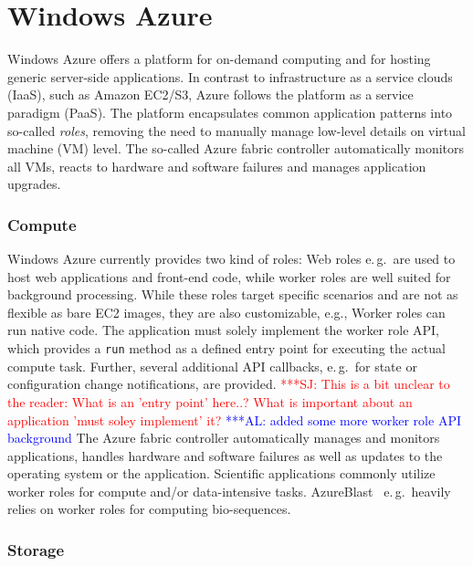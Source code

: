 \documentclass[conference,final]{IEEEtran}
\newcommand{\up}{\vspace*{-1em}}
\newcommand{\alnote}[1]{ {\textcolor{blue} { ***AL: #1 }}}
\newcommand{\jhanote}[1]{ {\textcolor{red} { ***SJ: #1 }}}
\newcommand{\alnote}[1]{}
\newcommand{\jhanote}[1]{}
\begin{document}
\section{Windows Azure}
\label{sec:azure}
\up
Windows Azure offers a platform for on-demand computing and for
hosting generic server-side applications.  In contrast to
infrastructure as a service clouds (IaaS), such as Amazon EC2/S3,
Azure follows the platform as a service paradigm (PaaS).  The platform
encapsulates common application patterns into so-called {\it roles},
removing the need to manually manage low-level details on virtual
machine (VM) level.  The so-called Azure fabric controller
automatically monitors all VMs, reacts to hardware and software
failures and manages application upgrades.

\subsubsection{Compute}

Windows Azure currently provides two kind of 
roles: Web roles e.\,g.\ are used to host web applications and
front-end code, while worker roles are well suited for background
processing. While these roles target specific scenarios and are not as
flexible as bare EC2 images, they are also customizable, %
e.g., Worker roles can run native code. The application must solely
implement the worker role API, which provides a \texttt{run} method as 
a defined entry point for executing the actual compute task. Further,
several additional API callbacks, e.\,g.\ for state or configuration
change notifications, are provided.%
\jhanote{This is a bit unclear to the
  reader: What is an 'entry point' here..? What is important about an
  application 'must soley implement' it?} \alnote{added some
  more worker role API background}
The Azure fabric controller automatically manages and monitors
applications, handles hardware and software failures as well as
updates to the operating system or the application.  Scientific
applications commonly utilize worker roles for compute and/or
data-intensive tasks. AzureBlast~\cite{azure_blast} e.\,g.\ heavily
relies on worker roles for computing bio-sequences.

\subsubsection{Storage}
\end{document}
